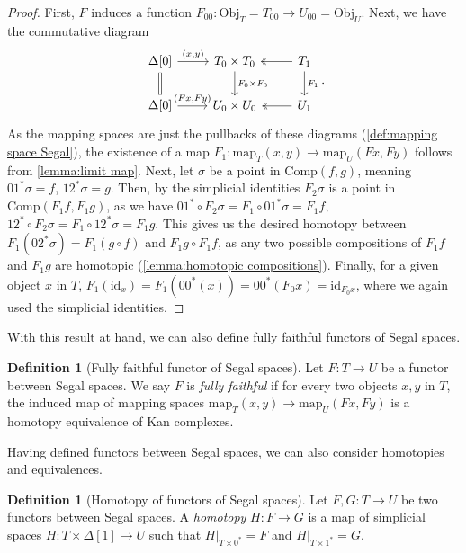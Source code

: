 \documentclass[11pt, a4paper]{amsart}
\newcommand{\map}{\mathrm{map}}
\newcommand{\id}{\mathrm{id}}
\newcommand{\Obj}{\mathrm{Obj}}
\newcommand{\Comp}{\mathrm{Comp}}
\theoremstyle{definition}
\newtheorem{definition}[equation]{Definition}
\theoremstyle{remark}
\numberwithin{equation}{section}
\begin{document}
\begin{proof}
 First, $F$ induces a function $F_{00}\colon \Obj_T = T_{00} \to U_{00} = \Obj_U$. Next, we have the commutative diagram 
 \[ 
  \begin{tikzcd}
     {\Delta[0]} \arrow[r, "{(x,y)}"] \arrow[d, equal] & T_0 \times T_0 \arrow[d, "F_0 \times F_0"] &  T_1 \arrow[d, "F_1"] \arrow[l,twoheadrightarrow]\\
    {\Delta[0]} \arrow[r, "{(Fx,Fy)}"] & U_0 \times U_0 & U_1 \arrow[l,twoheadrightarrow] 
  \end{tikzcd}.
 \]
 As the mapping spaces are just the pullbacks of these diagrams (\cref{def:mapping space Segal}), the existence of a map $F_1\colon\map_T(x,y) \to \map_U(Fx,Fy)$ follows from \cref{lemma:limit map}. Next, let $\sigma$ be a point in $\Comp(f,g)$, meaning $01^*\sigma = f$, $12^*\sigma = g$. Then, by the simplicial identities $F_2\sigma$ is a point in $\Comp(F_1f,F_1g)$, as we have $01^*\circ F_2\sigma = F_1 \circ 01^*\sigma = F_1f$, $12^*\circ F_2\sigma = F_1 \circ 12^*\sigma = F_1g$. This gives us the desired homotopy between $F_1(02^*\sigma) = F_1(g \circ f)$ and $F_1g \circ F_1f$, as any two possible compositions of $F_1f$ and $F_1g$ are homotopic (\cref{lemma:homotopic compositions}). Finally, for a given object $x$ in $T$, $F_1(\id_x) = F_1(00^*(x)) = 00^*(F_0x) = \id_{F_0x}$, where we again used the simplicial identities.
\end{proof}

With this result at hand, we can also define fully faithful functors of Segal spaces.

\begin{definition}[Fully faithful functor of Segal spaces]
  Let $F\colon T \to U$ be a functor between Segal spaces. We say $F$ is \emph{fully faithful} if for every two objects $x,y$ in $T$, the induced map of mapping spaces $\map_T(x,y) \to \map_U(Fx,Fy)$ is a homotopy equivalence of Kan complexes.
\end{definition}

Having defined functors between Segal spaces, we can also consider homotopies and equivalences.  

\begin{definition}[Homotopy of functors of Segal spaces]
  Let $F,G\colon T \to U$ be two functors between Segal spaces. A \emph{homotopy} $H \colon F \to G$ is a map of simplicial spaces $H\colon T \times \Delta[1] \to U$ such that $H|_{T \times 0^*} = F$ and $H|_{T \times 1^*} = G$.
\end{definition}
\end{document}
